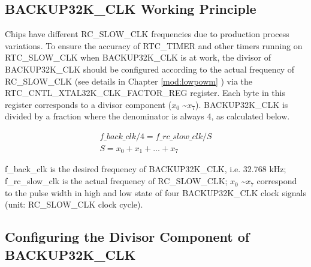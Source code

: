 \documentclass[main\_\_EN.tex]{subfiles}
\begin{document}
\subsection{BACKUP32K\_CLK Working Principle}\label{sec:xtwdt-divisor-config}
Chips have different RC\_SLOW\_CLK frequencies due to production process variations. To ensure the accuracy of RTC\_TIMER and other timers running on RTC\_SLOW\_CLK when BACKUP32K\_CLK is at work, the divisor of BACKUP32K\_CLK should be configured according to the actual frequency of RC\_SLOW\_CLK (see details in Chapter \ref{mod:lowpowm} \textit{}) via the RTC\_CNTL\_XTAL32K\_CLK\_FACTOR\_REG register. Each byte in this register corresponds to a divisor component (\begin{math}x_0\end{math} \textasciitilde \begin{math}x_7\end{math}). BACKUP32K\_CLK is divided by a fraction 
where the denominator is always 4, as calculated below. 

\begin{gather*}
f\_back\_clk / 4 = f\_rc\_slow\_clk/S \\
S = x_0 + x_1 + ... + x_7
\end{gather*}

f\_back\_clk is the desired frequency of BACKUP32K\_CLK, i.e. 32.768 kHz; f\_rc\_slow\_clk is the actual frequency of RC\_SLOW\_CLK; \begin{math}x_0\end{math} \textasciitilde \begin{math}x_7\end{math} correspond to the pulse width in high and low state of four BACKUP32K\_CLK clock signals (unit: RC\_SLOW\_CLK clock cycle).

\subsection{Configuring the Divisor Component of BACKUP32K\_CLK}
\end{document}

